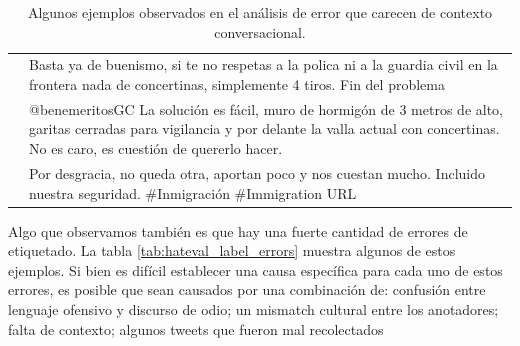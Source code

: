 \begin{table}
\begin{tabularx}{\textwidth}{l X}
                      & Basta ya de buenismo, si te no respetas a la polica ni a la guardia civil en la frontera nada de concertinas, simplemente 4 tiros. Fin del problema \\
                      & @benemeritosGC La solución es fácil, muro de hormigón de 3 metros de alto, garitas cerradas para vigilancia y por delante la valla actual con concertinas. No es caro, es cuestión de quererlo hacer. \\
                      & Por desgracia, no queda otra, aportan poco y nos cuestan mucho. Incluido nuestra seguridad. \#Inmigración \#Immigration URL \\
        \hline
    \end{tabularx}
    \caption{Algunos ejemplos observados en el análisis de error que carecen de contexto conversacional.}
    \label{tab:hateval_lack_of_context}
\end{table}


Algo que observamos también es que hay una fuerte cantidad de errores de etiquetado. La tabla \ref{tab:hateval_label_errors} muestra algunos de estos ejemplos. Si bien es difícil establecer una causa específica para cada uno de estos errores, es posible que sean causados por una combinación de: confusión entre lenguaje ofensivo y discurso de odio; un mismatch cultural entre los anotadores; falta de contexto; algunos tweets que fueron mal recolectados

